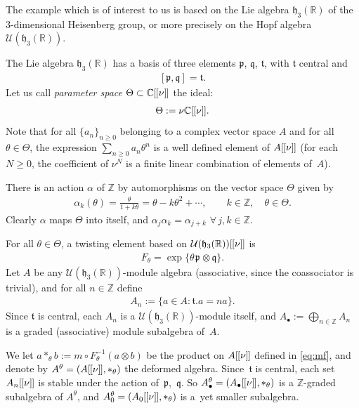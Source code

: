 \documentclass[10pt,a4paper]{amsart}
\numberwithin{equation}{section}
\theoremstyle{definition}
\newcommand{\U}{\mathcal{U}}
\newcommand{\R}{\mathbb{R}}
\newcommand{\C}{\mathbb{C}}
\newcommand{\Z}{\mathbb{Z}}
\newcommand{\mf}{\mathfrak}
\newcommand{\lbrak}{[\hspace{-0.5pt}[}
\newcommand{\rbrak}{]\hspace{-0.5pt}]}
\newcommand{\ga}{\mf{p}}
\newcommand{\gb}{\mf{q}}
\newcommand{\gc}{\mf{t}}
\renewcommand{\hbar}{\nu}
\begin{document}
The example which is of interest to us is based on the Lie algebra $\mf{h}_3(\R)$ of the $3$-dimensional Heisenberg group, or more precisely on the Hopf algebra
$\U(\mf{h}_3(\R))$.

The Lie algebra $\mf{h}_3(\R)$ has a basis of three elements $\ga$, $\gb$, $\gc$, with $\gc$ central and
\begin{gather}\label{eq:h3R}
[\ga,\gb]=\gc .
\end{gather}
Let us call \emph{parameter space}
$\Theta\subset\C\lbrak\hbar\rbrak$ the ideal:
\begin{gather*}
\Theta:=\hbar \C\lbrak\hbar\rbrak .
\end{gather*}
Note that for all $\{a_n\}_{n\geq 0}$ belonging to a complex vector space $A$ and for all $\theta\in\Theta$, the expression $\sum_{n\geq 0}a_n\theta^n$ is a well def\/ined element of $A\lbrak\hbar\rbrak$ (for each $N\geq 0$, the coef\/f\/icient of $\hbar^N$ is a f\/inite linear combination
of elements of~$A$).

There is an action $\alpha$ of $\Z$ by automorphisms on the vector space $\Theta$ given by{\samepage
\begin{gather}\label{eq:nact}
\alpha_k(\theta)=\frac{\theta}{1+k\theta}=
\theta-k\theta^2+\cdots
 ,\qquad k\in\Z,\quad \theta\in\Theta.
\end{gather}
Clearly $\alpha$ maps $\Theta$ into itself, and $\alpha_j\alpha_k=\alpha_{j+k}$ $\forall\, j,k\in\Z$.}

For all $\theta\in\Theta$, a twisting element based on $\U(\mf{h}_3(\R))\lbrak \hbar\rbrak$ is
\begin{gather*}
F_\theta=\exp\big\{\theta\hspace{1pt}\ga\hspace{1pt}\otimes\gb\big\} .
\end{gather*}
Let $A$ be any $\U(\mf{h}_3(\R))$-module algebra (associative, since the coassociator is trivial), and for all $n\in\Z$ def\/ine
\begin{gather}\label{eq:An}
A_n:=\big\{ a\in A\colon \gc.a=na \big\} .
\end{gather}
Since $\gc$ is central, each $A_n$ is a $\U(\mf{h}_3(\R))$-module itself, and $A_\bullet:=\bigoplus_{n\in\Z}A_n$ is a graded (associative) module subalgebra of~$A$.

We let $a\ast_\theta b:=m\circ F_\theta^{-1}(a\otimes b)$ be the product on $A\lbrak\hbar\rbrak$ def\/ined in \eqref{eq:mf}, and denote by $A^\theta=(A\lbrak\hbar\rbrak,\ast_\theta)$ the deformed algebra.
Since~$\gc$ is central, each set $A_n\lbrak\hbar\rbrak$ is stable under the action of~$\ga$,~$\gb$. So
$A^\theta_\bullet=(A_\bullet\lbrak\hbar\rbrak,\ast_\theta)$ is a $\Z$-graded subalgebra of $A^\theta$, and $A^\theta_0=(A_0\lbrak\hbar\rbrak,\ast_\theta)$ is a~yet smaller subalgebra.
\end{document}
